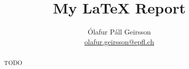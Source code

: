 \documentclass[11pt,a4paper]{article}
\begin{document}
\title{My LaTeX Report}
\author{Ólafur Páll Geirsson \\ \href{mailto:olafur.geirsson@epfl.ch}{olafur.geirsson@epfl.ch}}

\date{}
\maketitle

\begin{abstract}
    TODO
\end{abstract}


% 

\end{document}

